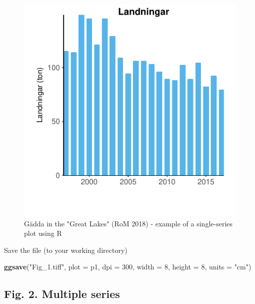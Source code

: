 \documentclass[]{article}
\newenvironment{Shaded}{\begin{snugshade}}{\end{snugshade}}
\newcommand{\KeywordTok}[1]{\textcolor[rgb]{0.13,0.29,0.53}{\textbf{#1}}}
\newcommand{\DataTypeTok}[1]{\textcolor[rgb]{0.13,0.29,0.53}{#1}}
\newcommand{\DecValTok}[1]{\textcolor[rgb]{0.00,0.00,0.81}{#1}}
\newcommand{\StringTok}[1]{\textcolor[rgb]{0.31,0.60,0.02}{#1}}
\newcommand{\NormalTok}[1]{#1}
\begin{document}
\begin{figure}

{\centering \includegraphics{Making_figures_for_RoM_in_R_files/figure-latex/unnamed-chunk-15-1} 

}

\caption{Gädda in the "Great Lakes" (RoM 2018) - example of a single-series plot using R}\label{fig:unnamed-chunk-15}
\end{figure}

Save the file (to your working directory)

\begin{Shaded}
\begin{Highlighting}[]
\KeywordTok{ggsave}\NormalTok{(}\StringTok{"Fig_1.tiff"}\NormalTok{, }\DataTypeTok{plot =}\NormalTok{ p1, }\DataTypeTok{dpi =} \DecValTok{300}\NormalTok{, }\DataTypeTok{width =} \DecValTok{8}\NormalTok{, }\DataTypeTok{height =} \DecValTok{8}\NormalTok{, }\DataTypeTok{units =} \StringTok{"cm"}\NormalTok{)}
\end{Highlighting}
\end{Shaded}

\subsection{Fig. 2. Multiple series}\label{fig.-2.-multiple-series}
\end{document}
